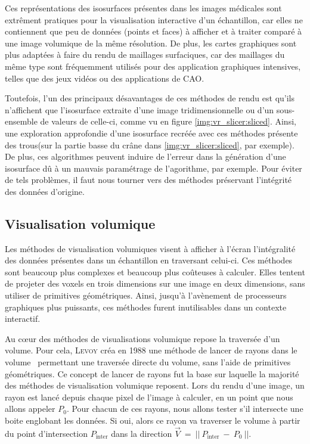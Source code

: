 {{{            Ces représentations des isosurfaces présentes dans les images médicales sont extrêment pratiques pour la visualisation interactive d'un échantillon, car elles ne contiennent que peu de données (points et faces) à afficher et à traiter comparé à une image volumique de la même résolution. De plus, les cartes graphiques sont plus adaptées à faire du rendu de maillages surfaciques, car des maillages du même type sont fréquemment utilisés pour des application graphiques intensives, telles que des jeux vidéos ou des applications de CAO.

            Toutefois, l'un des principaux désavantages de ces méthodes de rendu est qu'ils n'affichent que l'isosurface extraite d'une image tridimensionnelle ou d'un sous-ensemble de valeurs de celle-ci, comme vu en figure \ref{img:vr_slicer:sliced}. Ainsi, une exploration approfondie d'une isosurface recréée avec ces méthodes présente des \og{}trous\fg (sur la partie basse du crâne dans \ref{img:vr_slicer:sliced}, par exemple). De plus, ces algorithmes peuvent induire de l'erreur dans la génération d'une isosurface dû à un mauvais paramétrage de l'agorithme, par exemple. Pour éviter de tels problèmes, il faut nous tourner vers des méthodes préservant l'intégrité des données d'origine.
        }

        \subsection{Visualisation volumique}
        {
            Les méthodes de visualisation volumiques visent à afficher à l'écran l'intégralité des données présentes dans un échantillon en traversant celui-ci. Ces méthodes sont beaucoup plus complexes et beaucoup plus coûteuses à calculer. Elles tentent de projeter des voxels en trois dimensions sur une image en deux dimensions, sans utiliser de primitives géométriques. Ainsi, jusqu'à l'avènement de processeurs graphiques plus puissants, ces méthodes furent inutilisables dans un contexte interactif.

            Au c\oe{}ur des méthodes de visualisations volumique repose la traversée d'un volume. Pour cela, \textsc{Levoy} créa en 1988 une méthode de lancer de rayons dans le volume~\cite{cite_raycast_volumic} permettant une traversée directe du volume, sans l'aide de primitives géométriques. Ce concept de lancer de rayons fut la base sur laquelle la majorité des méthodes de visualisation volumique reposent. Lors du rendu d'une image, un rayon est lancé depuis chaque pixel de l'image à calculer, en un point que nous allons appeler $P_0$. Pour chacun de ces rayons, nous allons tester s'il intersecte une boite englobant les données. Si oui, alors ce rayon va traverser le volume à partir du point d'intersection $P_{\text{inter}}$ dans la direction $\Vec{V}~=~||~P_{\text{inter}}~-~P_0~||$.

}}}
